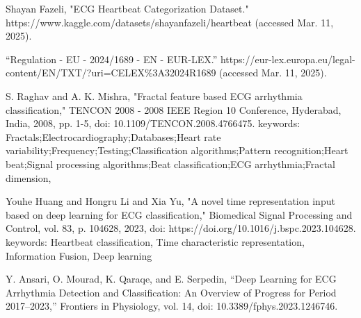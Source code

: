 \documentclass[conference]{IEEEtran}
\begin{document}













\begin{thebibliography}{00}
     Shayan Fazeli, "ECG Heartbeat Categorization Dataset."  https://www.kaggle.com/datasets/shayanfazeli/heartbeat (accessed Mar. 11, 2025).

     “Regulation - EU - 2024/1689 - EN - EUR-LEX.” https://eur-lex.europa.eu/legal-content/EN/TXT/?uri=CELEX\%3A32024R1689 (accessed Mar. 11, 2025).

     S. Raghav and A. K. Mishra, "Fractal feature based ECG arrhythmia classification," TENCON 2008 - 2008 IEEE Region 10 Conference, Hyderabad, India, 2008, pp. 1-5, doi: 10.1109/TENCON.2008.4766475. keywords: {Fractals;Electrocardiography;Databases;Heart rate variability;Frequency;Testing;Classification algorithms;Pattern recognition;Heart beat;Signal processing algorithms;Beat classification;ECG arrhythmia;Fractal dimension},

     Youhe Huang and Hongru Li and Xia Yu, "A novel time representation input based on deep learning for ECG classification," Biomedical Signal Processing and Control, vol. 83, p. 104628, 2023, doi: https://doi.org/10.1016/j.bspc.2023.104628. keywords: {Heartbeat classification, Time characteristic representation, Information Fusion, Deep learning}

     Y. Ansari, O. Mourad, K. Qaraqe, and E. Serpedin, “Deep Learning for ECG Arrhythmia Detection and Classification: An Overview of Progress for Period 2017–2023,” Frontiers in Physiology, vol. 14, doi: 10.3389/fphys.2023.1246746.
\end{thebibliography}
\end{document}
